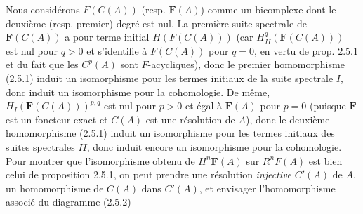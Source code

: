 Nous considérons $F(C(A))$ (resp. $\mathbf F(A)$) comme un bicomplexe dont le
deuxième (resp. premier) degré est nul. La première suite spectrale de
$\mathbf F(C(A))$ a pour terme initial $H(F(C(A)))$ (car
$H_{II}^q(\mathbf F(C(A)))$ est nul pour $q>0$ et s'identifie à
$F(C(A))$ pour $q=0$, en vertu de prop. 2.5.1 et du fait que les $C^p(A)$ sont
$F$-acycliques), donc le premier homomorphisme (2.5.1) induit un isomorphisme
pour les termes initiaux de la suite spectrale $I$, donc induit un
isomorphisme pour la cohomologie. De même,
$H_I(\mathbf F(C(A)))^{p,q}$ est nul pour $p>0$ et égal à
$\mathbf F(A)$ pour $p=0$ (puisque $\mathbf F$ est un foncteur exact et
$C(A)$ est une résolution de $A$), donc le deuxième homomorphisme (2.5.1)
induit un isomorphisme pour les termes initiaux des suites spectrales $II$,
donc induit encore un isomorphisme pour la cohomologie. Pour montrer que
l'isomorphisme obtenu de $H^n\mathbf F(A)$ sur $R^nF(A)$ est bien celui de
proposition 2.5.1, on peut prendre une résolution \textit{injective} $C'(A)$
de $A$, un homomorphisme de $C(A)$ dans $C'(A)$, et envisager
l'homomorphisme associé du diagramme (2.5.2)


